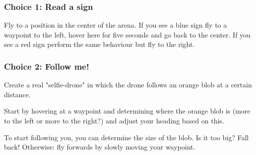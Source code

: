 \documentclass{article}
\begin{document}
\subsubsection*{Choice 1: Read a sign}
Fly to a position in the center of the arena. If you see a blue sign fly to a waypoint to the left, hover here for five seconds and go back to the center. If you see a red sign perform the same behaviour but fly to the right. 

\subsubsection*{Choice 2: Follow me!}
Create a real "selfie-drone" in which the drone follows an orange blob at a certain distance.

Start by hovering at a waypoint and determining where the orange blob is (more to the left or more to the right?) and adjust your heading based on this.

To start following you, you can determine the size of the blob. Is it too big? Fall back! Otherwise: fly forwards by slowly moving your waypoint.
\end{document}
